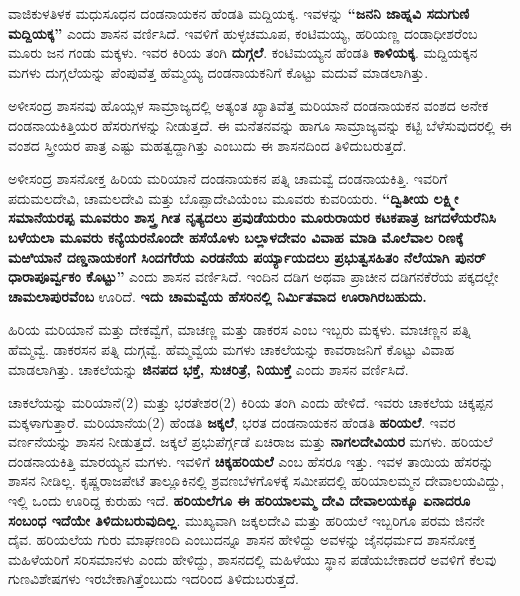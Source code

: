 ವಾಜಿಕುಳತಿಳಕ ಮಧುಸೂಧನ ದಂಡನಾಯಕನ ಹೆಂಡತಿ ಮದ್ದಿಯಕ್ಕ. ಇವಳನ್ನು \textbf{“ಜನನಿ ಜಾಹ್ನವಿ ಸದುಗುಣಿ ಮದ್ದಿಯಕ್ಕ”} ಎಂದು ಶಾಸನ ವರ್ಣಿಸಿದೆ. ಇವಳಿಗೆ ಹುಳ್ಳಚಮೂಪ, ಕಂಟಿಮಯ್ಯ, ಹರಿಯಣ್ಣ ದಂಡಾಧೀಶರೆಂಬ ಮೂರು ಜನ ಗಂಡು ಮಕ್ಕಳು. ಇವರ ಕಿರಿಯ ತಂಗಿ \textbf{ದುಗ್ಗಲೆ}. ಕಂಟಿಮಯ್ಯನ ಹೆಂಡತಿ \textbf{ಕಾಳಿಯಕ್ಕ}. ಮದ್ದಿಯಕ್ಕನ ಮಗಳು ದುಗ್ಗಲೆಯನ್ನು ಪೆಂಪುವೆತ್ತ ಹೆಮ್ಮಯ್ಯ ದಂಡನಾಯಕನಿಗೆ ಕೊಟ್ಟು ಮದುವೆ ಮಾಡಲಾಗಿತ್ತು.

ಅಳೀಸಂದ್ರ ಶಾಸನವು ಹೊಯ್ಸಳ ಸಾಮ್ರಾಜ್ಯದಲ್ಲಿ ಅತ್ಯಂತ ಖ್ಯಾತಿವೆತ್ತ ಮರಿಯಾನೆ ದಂಡನಾಯಕನ ವಂಶದ ಅನೇಕ ದಂಡನಾಯಕಿತ್ತಿಯರ ಹೆಸರುಗಳನ್ನು ನೀಡುತ್ತದೆ. ಈ ಮನೆತನವನ್ನು ಹಾಗೂ ಸಾಮ್ರಾಜ್ಯವನ್ನು ಕಟ್ಟಿ ಬೆಳೆಸುವುದರಲ್ಲಿ ಈ ವಂಶದ ಸ್ತ್ರೀಯರ ಪಾತ್ರ ಎಷ್ಟು ಮಹತ್ವದ್ದಾಗಿತ್ತು ಎಂಬುದು ಈ ಶಾಸನದಿಂದ ತಿಳಿದುಬರುತ್ತದೆ.

ಅಳೀಸಂದ್ರ ಶಾಸನೋಕ್ತ ಹಿರಿಯ ಮರಿಯಾನೆ ದಂಡನಾಯಕನ ಪತ್ನಿ ಚಾಮವ್ವೆ ದಂಡನಾಯಕಿತ್ತಿ. ಇವರಿಗೆ ಪದುಮಲದೇವಿ, ಚಾಮಲದೇವಿ ಮತ್ತು ಬೊಪ್ಪಾದೇವಿಯೆಂಬ ಮೂವರು ಕುವರಿಯರು. \textbf{“ದ್ವಿತೀಯ ಲಕ್ಷ್ಮೀ ಸಮಾನೆಯರಪ್ಪ ಮೂವರುಂ ಶಾಸ್ತ್ರ ಗೀತ ನೃತ್ಯದಲು ಪ್ರವುಡೆಯರುಂ ಮೂರುರಾಯರ ಕಟಕಪಾತ್ರ ಜಗದಳೆಯರೆನಿಸಿ ಬಳೆಯಲಾ ಮೂವರು ಕನ್ಯೆಯರನೊಂದೇ ಹಸೆಯೊಳು ಬಲ್ಲಾಳದೇವಂ ವಿವಾಹ ಮಾಡಿ ಮೊಲೆವಾಲ ರಿಣಕ್ಕೆ ಮಱಿಯಾನೆ ದಣ್ಡನಾಯಕಂಗೆ ಸಿಂದಗೆರೆಯ ಎರಡನೆಯ ಪರ್ಯ್ಯಾಯದಲು ಪ್ರಭುತ್ವಸಹಿತಂ ನೆಲೆಯಾಗಿ ಪುನರ್​ಧಾರಾಪೂರ್ವ್ವಕಂ ಕೊಟ್ಟು”} ಎಂದು ಶಾಸನ ವರ್ಣಿಸಿದೆ. ಇಂದಿನ ದಡಿಗ ಅಥವಾ ಪ್ರಾಚೀನ ದಡಿಗನಕೆರೆಯ ಪಕ್ಕದಲ್ಲೇ \textbf{ಚಾಮಲಾಪುರವೆಂಬ} ಊರಿದೆ. \textbf{ಇದು ಚಾಮವ್ವೆಯ ಹೆಸರಿನಲ್ಲಿ ನಿರ್ಮಿತವಾದ ಊರಾಗಿರಬಹುದು.}

ಹಿರಿಯ ಮರಿಯಾನೆ ಮತ್ತು ದೇಕವ್ವೆಗೆ, ಮಾಚಣ್ಣ ಮತ್ತು ಡಾಕರಸ ಎಂಬ ಇಬ್ಬರು ಮಕ್ಕಳು. ಮಾಚಣ್ಣನ ಪತ್ನಿ ಹೆಮ್ಮವ್ವೆ. ಡಾಕರಸನ ಪತ್ನಿ ದುಗ್ಗವ್ವೆ. ಹೆಮ್ಮವ್ವೆಯ ಮಗಳು ಚಾಕಲೆಯನ್ನು ಕಾವರಾಜನಿಗೆ ಕೊಟ್ಟು ವಿವಾಹ ಮಾಡಲಾಗಿತ್ತು. ಚಾಕಲೆಯನ್ನು \textbf{ಜಿನಪದ ಭಕ್ತೆ, ಸುಚರಿತ್ರೆ, ನಿಯುಕ್ತೆ} ಎಂದು ಶಾಸನ ವರ್ಣಿಸಿದೆ.

ಚಾಕಲೆಯನ್ನು ಮರಿಯಾನೆ(2) ಮತ್ತು ಭರತೇಶರ(2) ಕಿರಿಯ ತಂಗಿ ಎಂದು ಹೇಳಿದೆ. ಇವರು ಚಾಕಲೆಯ ಚಿಕ್ಕಪ್ಪನ ಮಕ್ಕಳಾಗುತ್ತಾರೆ. ಮರಿಯಾನೆಯ(2) ಹೆಂಡತಿ \textbf{ಜಕ್ಕಲೆ}, ಭರತ ದಂಡನಾಯಕನ ಹೆಂಡತಿ \textbf{ಹರಿಯಲೆ}. ಇವರ ವರ್ಣನೆಯನ್ನು ಶಾಸನ ನೀಡುತ್ತದೆ. ಜಕ್ಕಲೆ ಪ್ರಭುಪೆರ್ಗ್ಗಡೆ ಏಚಿರಾಜ ಮತ್ತು \textbf{ನಾಗಲದೇವಿಯರ} ಮಗಳು. ಹರಿಯಲೆ ದಂಡನಾಯಕಿತ್ತಿ ಮಾರಯ್ಯನ ಮಗಳು. ಇವಳಿಗೆ \textbf{ಚಿಕ್ಕಹರಿಯಲೆ} ಎಂಬ ಹೆಸರೂ ಇತ್ತು. ಇವಳ ತಾಯಿಯ ಹೆಸರನ್ನು ಶಾಸನ ನೀಡಿಲ್ಲ. ಕೃಷ್ಣರಾಜಪೇಟೆ ತಾಲ್ಲೂಕಿನಲ್ಲಿ ಶ್ರವಣಬೆಳಗೊಳಕ್ಕೆ ಸಮೀಪದಲ್ಲಿ ಹರಿಯಾಲಮ್ಮನ ದೇವಾಲಯವಿದ್ದು, ಇಲ್ಲಿ ಒಂದು ಊರಿದ್ದ ಕುರುಹು ಇದೆ. \textbf{ಹರಿಯಲೆಗೂ ಈ ಹರಿಯಾಲಮ್ಮ ದೇವಿ ದೇವಾಲಯಕ್ಕೂ ಏನಾದರೂ ಸಂಬಂಧ ಇದೆಯೇ ತಿಳಿದುಬರುವುದಿಲ್ಲ}. ಮುಖ್ಯವಾಗಿ ಜಕ್ಕಲದೇವಿ ಮತ್ತು ಹರಿಯಲೆ ಇಬ್ಬರಿಗೂ ಪರಮ ಜಿನನೇ ದೈವ. ಹರಿಯಲೆಯ ಗುರು ಮಾಘಣಂದಿ ಎಂಬುದನ್ನೂ ಶಾಸನ ಹೇಳಿದ್ದು ಅವಳನ್ನು ಜೈನಧರ್ಮದ ಶಾಸನೋಕ್ತ ಮಹಿಳೆಯರಿಗೆ ಸರಿಸಮಾನಳು ಎಂದು ಹೇಳಿದ್ದು, ಶಾಸನದಲ್ಲಿ ಮಹಿಳೆಯು ಸ್ಥಾನ ಪಡೆಯಬೇಕಾದರೆ ಅವಳಿಗೆ ಕೆಲವು ಗುಣವಿಶೇಷಗಳು ಇರಬೇಕಾಗಿತ್ತೆಂಬುದು ಇದರಿಂದ ತಿಳಿದುಬರುತ್ತದೆ.

